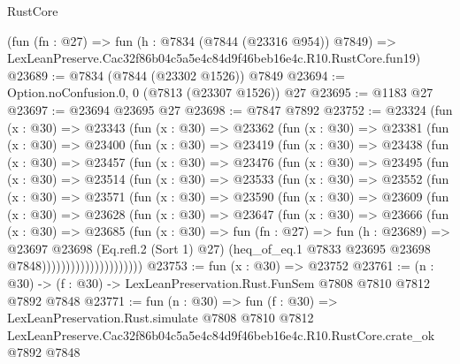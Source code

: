 \begin{lexlean}{RustCore}
\begin{coremodule}
    (fun (fn : @27) =>
    fun (h : @7834 (@7844 (@23316 @954)) @7849) =>
    LexLeanPreserve.Cac32f86b04c5a5e4c84d9f46beb16e4c.R10.RustCore.fun19)
@23689 := @7834 (@7844 (@23302 @1526)) @7849
@23694 := Option.noConfusion.{0, 0} (@7813 (@23307 @1526)) @27
@23695 := @1183 @27
@23697 := @23694 @23695 @27
@23698 := @7847 @7892
@23752 := @23324
    (fun (x : @30) =>
    @23343
      (fun (x : @30) =>
      @23362
        (fun (x : @30) =>
        @23381
          (fun (x : @30) =>
          @23400
            (fun (x : @30) =>
            @23419
              (fun (x : @30) =>
              @23438
                (fun (x : @30) =>
                @23457
                  (fun (x : @30) =>
                  @23476
                    (fun (x : @30) =>
                    @23495
                      (fun (x : @30) =>
                      @23514
                        (fun (x : @30) =>
                        @23533
                          (fun (x : @30) =>
                          @23552
                            (fun (x : @30) =>
                            @23571
                              (fun (x : @30) =>
                              @23590
                                (fun (x : @30) =>
                                @23609
                                  (fun (x : @30) =>
                                  @23628
                                    (fun (x : @30) =>
                                    @23647
                                      (fun (x : @30) =>
                                      @23666
                                        (fun (x : @30) =>
                                        @23685
                                          (fun (x : @30) =>
                                          fun (fn : @27) =>
                                          fun (h : @23689) =>
                                          @23697
                                            @23698
                                            (Eq.refl.{2} (Sort 1) @27)
                                            (heq_of_eq.{1}
                                              @7833
                                              @23695
                                              @23698
                                              @7848)))))))))))))))))))))
@23753 := fun (x : @30) => @23752
@23761 := (n : @30) -> (f : @30) -> LexLeanPreservation.Rust.FunSem @7808 @7810 @7812 @7892 @7848
@23771 := fun (n : @30) =>
  fun (f : @30) =>
  LexLeanPreservation.Rust.simulate
    @7808
    @7810
    @7812
    LexLeanPreserve.Cac32f86b04c5a5e4c84d9f46beb16e4c.R10.RustCore.crate_ok
    @7892
    @7848
\end{coremodule}
\end{lexlean}
